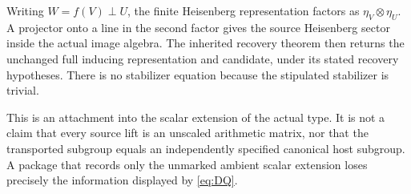 Writing $W=f(V)\perp U$, the finite Heisenberg representation factors as $\eta_V\otimes\eta_U$. A projector onto a line in the second factor gives the source Heisenberg sector inside the actual image algebra. The inherited recovery theorem then returns the unchanged full inducing representation and candidate, under its stated recovery hypotheses. There is no stabilizer equation because the stipulated stabilizer is trivial.

This is an attachment into the scalar extension of the actual type. It is not a claim that every source lift is an unscaled arithmetic matrix, nor that the transported subgroup equals an independently specified canonical host subgroup. A package that records only the unmarked ambient scalar extension loses precisely the information displayed by \eqref{eq:DQ}.


